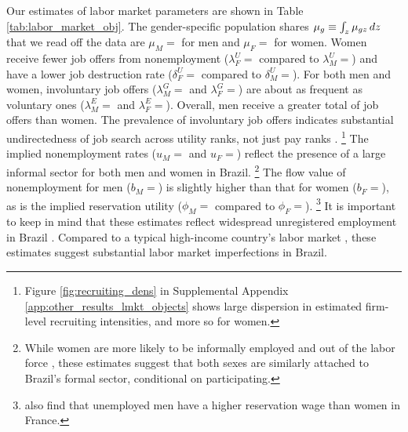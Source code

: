 Our estimates of labor market parameters are shown in Table \ref{tab:labor_market_obj}. %
%
The gender-specific population shares $\mu_{g} \equiv \int_{z} \mu_{gz} \mathop{}\!{d} z$ that we read off the data are $\mu_{M} = $ for men and $\mu_{F} = $ for women. %
%
Women receive fewer job offers from nonemployment ($\lambda_{F}^{U} = $ compared to $\lambda_{M}^{U} = $) and have a lower job destruction rate ($\delta_{F}^{U} = $ compared to $\delta_{M}^{U} = $). %
%
For both men and women, involuntary job offers ($\lambda_{M}^{G} = $ and $\lambda_{F}^{G} = $) are about as frequent as voluntary ones ($\lambda_{M}^{E} = $ and $\lambda_{F}^{E} = $). Overall, men receive a greater total of job offers than women. The prevalence of involuntary job offers indicates substantial undirectedness of job search across utility ranks, not just pay ranks \citep{JolivetPostel-VinayRobin2006}.%
%
\footnote{Figure \ref{fig:recruiting_dens} in Supplemental Appendix \ref{app:other_results_lmkt_objects} shows large dispersion in estimated firm-level recruiting intensities, and more so for women.} %
%
The implied nonemployment rates ($u_{M} = $ and $u_{F} = $) reflect the presence of a large informal sector for both men and women in Brazil.%
%
\footnote{While women are more likely to be informally employed \citep{EngbomGonzagaMoserOlivieri2022} and out of the labor force \citep{WorldBank2022}, these estimates suggest that both sexes are similarly attached to Brazil's formal sector, conditional on participating.} %
%
The flow value of nonemployment for men ($b_{M} = $) is slightly higher than that for women ($b_{F} = $), as is the implied reservation utility ($\phi_{M} = $ compared to $\phi_{F} = $).%
%
\footnote{\citet{LeBarbanchonRathelotRoulet2020} also find that unemployed men have a higher reservation wage than women in France.} %
%
It is important to keep in mind that these estimates reflect widespread unregistered employment in Brazil \citep{MeghirNaritaRobin2015}. Compared to a typical high-income country's labor market \citep{TaberVejlin2020}, these estimates suggest substantial labor market imperfections in Brazil.

